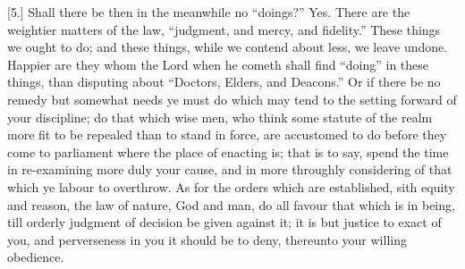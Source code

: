 [5.] Shall there be then in the meanwhile no “doings?” Yes. There are the weightier matters of the law, “judgment, and mercy, and fidelity.” These things we ought to do; and these things, while we contend about less, we leave undone. Happier are they whom the Lord when he cometh shall find “doing” in these things, than disputing about “Doctors, Elders, and Deacons.” Or if there be no remedy but somewhat needs ye must do which may tend to the setting forward of your discipline; do that which wise men, who think some statute of the realm more fit to be repealed than to stand in force, are accustomed to do before they come to parliament where the place of enacting is; that is to say, spend the time in re-examining more duly your cause, and in more throughly considering of that which ye labour to overthrow. As for the orders which are established, sith equity and reason, the law of nature, God and man, do all favour that which is in being, till orderly judgment of decision be given against it; it is but justice to exact of you, and perverseness in you it should be to deny, thereunto your willing obedience.

